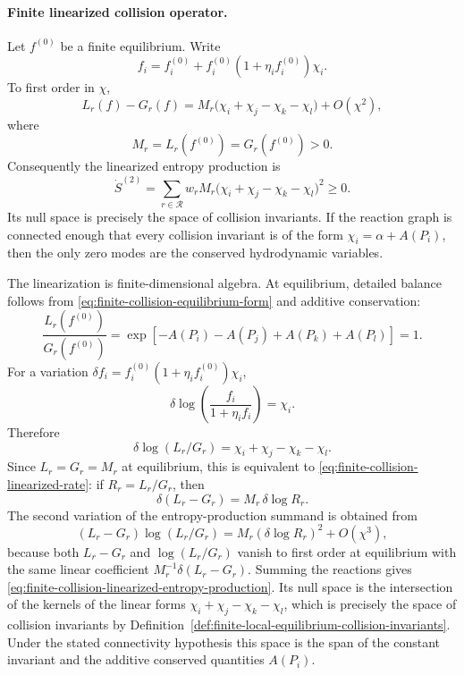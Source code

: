 \paragraph{Finite linearized collision operator.}
Let \(f^{(0)}\) be a finite equilibrium.  Write
\begin{equation}
  f_i=f_i^{(0)}+f_i^{(0)}(1+\eta_i f_i^{(0)})\chi_i .
  \label{eq:finite-collision-linearization}
\end{equation}
To first order in \(\chi\),
\begin{equation}
  L_r(f)-G_r(f)
  =
  M_r
  \bigl(\chi_i+\chi_j-\chi_k-\chi_l\bigr)+O(\chi^2),
  \label{eq:finite-collision-linearized-rate}
\end{equation}
where
\begin{equation}
  M_r=L_r(f^{(0)})=G_r(f^{(0)})>0 .
  \label{eq:finite-collision-equilibrium-weight}
\end{equation}
Consequently the linearized entropy production is
\begin{equation}
  \dot S^{(2)}
  =
  \sum_{r\in\mathcal R}
  w_rM_r
  \bigl(\chi_i+\chi_j-\chi_k-\chi_l\bigr)^2\ge0.
  \label{eq:finite-collision-linearized-entropy-production}
\end{equation}
Its null space is precisely the space of collision invariants.  If the
reaction graph is connected enough that every collision invariant is of the
form \(\chi_i=\alpha+A(P_i)\), then the only zero modes are the conserved
hydrodynamic variables.

The linearization is finite-dimensional algebra.  At equilibrium, detailed
balance follows from
\eqref{eq:finite-collision-equilibrium-form} and additive conservation:
\[
  \frac{L_r(f^{(0)})}{G_r(f^{(0)})}
  =
  \exp[-A(P_i)-A(P_j)+A(P_k)+A(P_l)]
  =
  1 .
  \]
For a variation \(\delta f_i=f_i^{(0)}(1+\eta_i f_i^{(0)})\chi_i\),
\[
  \delta\log\!\left(\frac{f_i}{1+\eta_i f_i}\right)=\chi_i .
  \]
Therefore
\[
  \delta\log(L_r/G_r)
  =
  \chi_i+\chi_j-\chi_k-\chi_l .
  \]
Since \(L_r=G_r=M_r\) at equilibrium, this is equivalent to
\eqref{eq:finite-collision-linearized-rate}: if \(R_r=L_r/G_r\), then
\[
  \delta(L_r-G_r)
  =
  M_r\,\delta\log R_r .
\]
The second variation of the entropy-production summand is obtained from
\[
  (L_r-G_r)\log(L_r/G_r)
  =
  M_r(\delta\log R_r)^2+O(\chi^3),
\]
because both \(L_r-G_r\) and \(\log(L_r/G_r)\) vanish to first order at
equilibrium with the same linear coefficient \(M_r^{-1}\delta(L_r-G_r)\).
Summing the reactions gives
\eqref{eq:finite-collision-linearized-entropy-production}.  Its null space
is the intersection of the kernels of the linear forms
\(\chi_i+\chi_j-\chi_k-\chi_l\), which is precisely the space of collision
invariants by Definition~\ref{def:finite-local-equilibrium-collision-invariants}.
Under the stated connectivity hypothesis this space is the span of the
constant invariant and the additive conserved quantities \(A(P_i)\).

